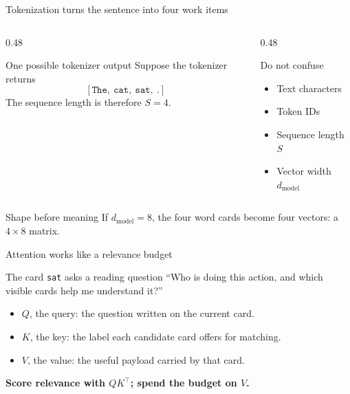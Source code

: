 \documentclass[aspectratio=169,11pt]{beamer}
\newcommand{\term}[1]{\textcolor{HUSTBlue}{\textbf{#1}}}
\begin{document}
\begin{frame}{Tokenization turns the sentence into four work items}
  \begin{columns}[T,totalwidth=\textwidth]
    \begin{column}{0.48\textwidth}
      \begin{block}{One possible tokenizer output}
        Suppose the tokenizer returns
        \[
          [\texttt{The},\ \texttt{cat},\ \texttt{sat},\ \texttt{.}]
        \]
        The sequence length is therefore \(S=4\).
      \end{block}
    \end{column}
    \begin{column}{0.48\textwidth}
      \begin{block}{Do not confuse}
        \begin{itemize}
          \item Text characters
          \item Token IDs
          \item Sequence length \(S\)
          \item Vector width \(d_{\text{model}}\)
        \end{itemize}
      \end{block}
    \end{column}
  \end{columns}
  \vspace{0.25cm}
  \begin{block}{Shape before meaning}
    If \(d_{\text{model}}=8\), the four word cards become four vectors: a \(4\times8\) matrix.
  \end{block}
\end{frame}

\begin{frame}{Attention works like a relevance budget}
  \begin{block}{The card \texttt{sat} asks a reading question}
    ``Who is doing this action, and which visible cards help me understand it?''
  \end{block}
  \begin{itemize}
    \item \(Q\), the query: the question written on the current card.
    \item \(K\), the key: the label each candidate card offers for matching.
    \item \(V\), the value: the useful payload carried by that card.
  \end{itemize}
  \vspace{0.3cm}
  \begin{center}
    \Large\term{Score relevance with \(QK^\top\); spend the budget on \(V\).}
  \end{center}
\end{frame}
\end{document}
